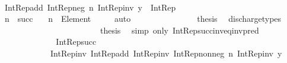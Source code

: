 \begin{isabellebody}
\ \ \ \ \ \ \ \ \ \ {\isacharparenright}{\kern0pt}{\isachardoublequoteclose}\isanewline
\ \ \ \ \ \ \ \ \isamarkupfalse%
\ {\isacharminus}{\kern0pt}\isanewline
\ \ \ \ \ \ \ \ \ \ \isanewline
\ \ \ \ \ \ \ \ \ \ \isamarkupfalse%
\ {\isachardoublequoteopen}Int{\isacharunderscore}{\kern0pt}Rep{\isacharunderscore}{\kern0pt}add\ {\isacharparenleft}{\kern0pt}Int{\isacharunderscore}{\kern0pt}Rep{\isacharunderscore}{\kern0pt}neg\ n{\isacharparenright}{\kern0pt}\ {\isacharparenleft}{\kern0pt}Int{\isacharunderscore}{\kern0pt}Rep{\isacharunderscore}{\kern0pt}inv\ y{\isacharparenright}{\kern0pt}\ {\isacharcolon}{\kern0pt}\ Int{\isacharunderscore}{\kern0pt}Rep{\isachardoublequoteclose}\isanewline
\ \ \ \ \ \ \ \ \ \ \isamarkupfalse%
\ {\isacharminus}{\kern0pt}\isanewline
\ \ \ \ \ \ \ \ \ \ \ \ \isamarkupfalse%
\ {\isacartoucheopen}n\ {\isacharequal}{\kern0pt}\ succ\ {\isacharunderscore}{\kern0pt}{\isacartoucheclose}\ \isamarkupfalse%
\ {\isachardoublequoteopen}n\ {\isacharcolon}{\kern0pt}\ Element\ {\isacharparenleft}{\kern0pt}{\isasymnat}\ {\isasymsetminus}\ {\isacharbraceleft}{\kern0pt}{}{\isacharbraceright}{\kern0pt}{\isacharparenright}{\kern0pt}{\isachardoublequoteclose}\ \isamarkupfalse%
\ auto\isanewline
\ \ \ \ \ \ \ \ \ \ \ \ \isamarkupfalse%
\ \isamarkupfalse%
\ {\isacharquery}{\kern0pt}thesis\ \isamarkupfalse%
\ discharge{\isacharunderscore}{\kern0pt}types\isanewline
\ \ \ \ \ \ \ \ \ \ \isamarkupfalse%
\isanewline
\ \ \ \ \ \ \ \ \ \ \isamarkupfalse%
\ \isamarkupfalse%
\ {\isacharquery}{\kern0pt}thesis\ \isamarkupfalse%
\ {\isacharparenleft}{\kern0pt}simp\ only{\isacharcolon}{\kern0pt}\ Int{\isacharunderscore}{\kern0pt}Rep{\isacharunderscore}{\kern0pt}succ{\isacharunderscore}{\kern0pt}inv{\isacharunderscore}{\kern0pt}eq{\isacharunderscore}{\kern0pt}inv{\isacharunderscore}{\kern0pt}pred{\isacharparenright}{\kern0pt}\isanewline
\ \ \ \ \ \ \ \ \isamarkupfalse%
\isanewline
\ \ \ \ \ \ \ \ \isamarkupfalse%
\ \isamarkupfalse%
\ {\isachardoublequoteopen}{\isachardot}{\kern0pt}{\isachardot}{\kern0pt}{\isachardot}{\kern0pt}\ {\isacharequal}{\kern0pt}\ Int{\isacharunderscore}{\kern0pt}Rep{\isacharunderscore}{\kern0pt}succ\ {\isacharparenleft}{\kern0pt}\isanewline
\ \ \ \ \ \ \ \ \ \ \ \ Int{\isacharunderscore}{\kern0pt}Rep{\isacharunderscore}{\kern0pt}inv\ {\isacharparenleft}{\kern0pt}Int{\isacharunderscore}{\kern0pt}Rep{\isacharunderscore}{\kern0pt}add\ {\isacharparenleft}{\kern0pt}Int{\isacharunderscore}{\kern0pt}Rep{\isacharunderscore}{\kern0pt}inv\ {\isacharparenleft}{\kern0pt}Int{\isacharunderscore}{\kern0pt}Rep{\isacharunderscore}{\kern0pt}nonneg\ n{\isacharparenright}{\kern0pt}{\isacharparenright}{\kern0pt}\ {\isacharparenleft}{\kern0pt}Int{\isacharunderscore}{\kern0pt}Rep{\isacharunderscore}{\kern0pt}inv\ y{\isacharparenright}{\kern0pt}{\isacharparenright}{\kern0pt}\isanewline

\end{isabellebody}
